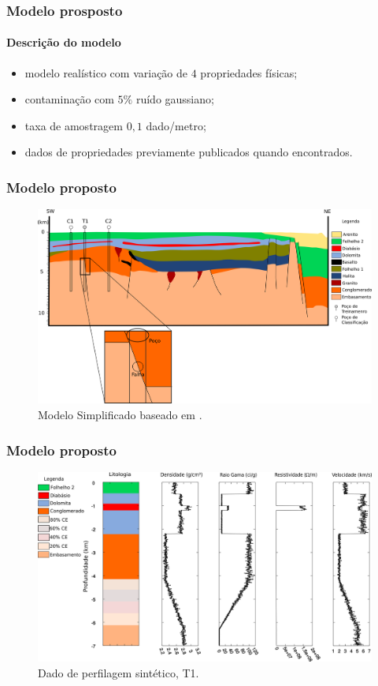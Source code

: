 \documentclass[aspectratio=10]{beamer} %
\begin{document}
\begin{frame}
\frametitle{Modelo prosposto}
\framesubtitle{Descrição do modelo}
\begin{itemize}
\item modelo realístico com variação de $4$ propriedades físicas;
\pause
\item contaminação com $5\%$ ruído gaussiano;
\pause
\item taxa de amostragem $0,1$ dado/metro;
\pause
\item dados de propriedades previamente publicados quando encontrados.
\end{itemize}

\end{frame}


\begin{frame}
\frametitle{Modelo proposto}
\begin{figure}[H]
\centering
\includegraphics[scale=0.35]{Imagens/Modelo.png}
\caption{Modelo Simplificado baseado em \cite{Sal2008}.}
\label{modelo}
\end{figure}
\end{frame}

\begin{frame}
\frametitle{Modelo proposto}
\begin{figure}[H]
\centering
\includegraphics[scale=0.37]{Imagens/PocoT1.png}
\caption{Dado de perfilagem sintético, T1. }
\label{T1}
\end{figure}
\end{frame}
\end{document}

